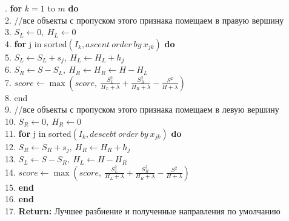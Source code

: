\documentclass[12pt,fleqn]{article}
\begin{document}
{\ttfamily
	. \textbf{for} $k = 1$ to $m$ \textbf{do}\\
	2. \hspace{15pt} //все объекты с пропуском этого признака помещаем в правую вершину\\
	3. \hspace{15pt} $S_L \leftarrow 0,~H_L \leftarrow 0$\\
	4. \hspace{15pt} \textbf{for} j in sorted$(I_k, ascent~order~by~x_{jk})$ \textbf{do}\\
	5. \hspace{30pt} $S_L \leftarrow S_L + s_j,~H_L \leftarrow H_L + h_j$\\
	6. \hspace{30pt} $S_R \leftarrow S - S_L,~ H_R \leftarrow H_R \leftarrow H - H_L$\\
	7. \hspace{30pt} $score \leftarrow \max(score,~\frac{S^2_L}{H_L + \lambda}+\frac{S^2_R}{H_R + \lambda} - \frac{S^2}{H + \lambda})$\\
	8. \hspace{15pt} end\\
	9. \hspace{15pt} //все объекты с пропуском этого признака помещаем в левую вершину\\
	10. \hspace{15pt} $S_R \leftarrow 0,~H_R \leftarrow 0$\\
	11. \hspace{15pt} \textbf{for} j in sorted$(I_k, descebt~order~by~x_{jk})$ \textbf{do}\\
	12. \hspace{30pt} $S_R \leftarrow S_R + s_j,~H_R \leftarrow H_R + h_j$\\
	13. \hspace{30pt} $S_L \leftarrow S - S_R,~H_L \leftarrow H - H_R$\\
	14. \hspace{30pt} $score \leftarrow \max(score,~\frac{S^2_L}{H_L + \lambda}+\frac{S^2_R}{H_R + \lambda} - \frac{S^2}{H + \lambda})$\\
	15. \hspace{15pt} \textbf{end}\\
	16. \textbf{end}\\
	17. \textbf{Return:} Лучшее разбиение и полученные направления по умолчанию\\
}
\vspace{5pt}
\hline
\vspace{5pt}
\end{document}
